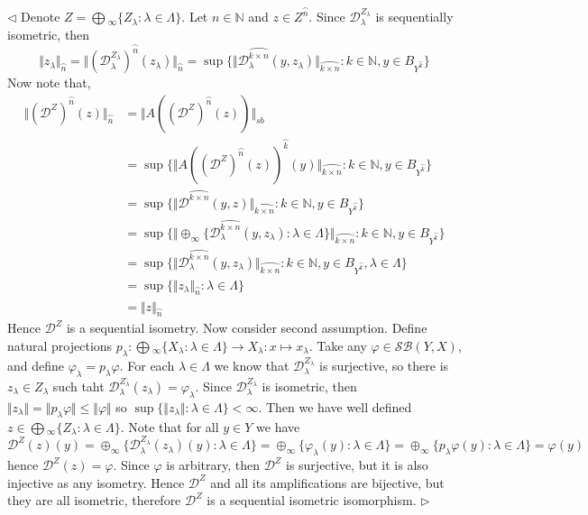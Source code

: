 \documentclass[12pt]{article}
\newenvironment{proof}{\par $\triangleleft$}{$\triangleright$}
\begin{document}
\begin{proof} Denote $Z=\bigoplus{}_\infty\{Z_\lambda:\lambda\in\Lambda\}$. Let $n\in\mathbb{N}$ and $z\in Z^{\wideparen{n}}$. Since $\mathcal{D}_\lambda^{Z_\lambda}$ is sequentially isometric, then
$$
\Vert z_\lambda\Vert_{\wideparen{n}}
=\Vert (\mathcal{D}_\lambda^{Z_\lambda})^{\wideparen{n}}(z_\lambda)\Vert_{\wideparen{n}}
=\sup\{\Vert \mathcal{D}_\lambda^{\wideparen{k\times n}}(y,z_\lambda)\Vert_{\wideparen{k\times n}}:k\in\mathbb{N},y\in B_{Y^{\wideparen{k}}}\}
$$
Now note that,
$$
\begin{aligned}
\Vert(\mathcal{D}^Z)^{\wideparen{n}}(z)\Vert_{\wideparen{n}}
&=\Vert A((\mathcal{D}^Z)^{\wideparen{n}}(z))\Vert_{sb}\\
&=\sup\{\Vert A((\mathcal{D}^Z)^{\wideparen{n}}(z))^{\wideparen{k}}(y)\Vert_{\wideparen{k\times n}}:k\in\mathbb{N},y\in B_{Y^{\wideparen{k}}}\}\\
&=\sup\{\Vert \mathcal{D}^{\wideparen{k\times n}}(y,z)\Vert_{\wideparen{k\times n}}:k\in\mathbb{N},y\in B_{Y^{\wideparen{k}}}\}\\
&=\sup\{\Vert \oplus_\infty\{\mathcal{D}_\lambda^{\wideparen{k\times n}}(y,z_\lambda):\lambda\in\Lambda\}\Vert_{\wideparen{k\times n}}:k\in\mathbb{N},y\in B_{Y^{\wideparen{k}}}\}\\
&=\sup\{\Vert \mathcal{D}_\lambda^{\wideparen{k\times n}}(y,z_\lambda)\Vert_{\wideparen{k\times n}}:k\in\mathbb{N},y\in B_{Y^{\wideparen{k}}},\lambda\in\Lambda\}\\
&=\sup\{\Vert z_\lambda\Vert_{\wideparen{n}}:\lambda\in\Lambda\}\\
&=\Vert z\Vert_{\wideparen{n}}
\end{aligned}
$$
Hence $\mathcal{D}^Z$ is a sequential isometry. Now consider second assumption. Define natural projections $p_\lambda:\bigoplus{}_\infty\{X_\lambda:\lambda\in\Lambda\}\to X_\lambda:x\mapsto x_\lambda$. Take any $\varphi\in\mathcal{SB}(Y,X)$, and define $\varphi_\lambda=p_\lambda\varphi$. For each $\lambda\in\Lambda$ we know that $\mathcal{D}_\lambda^{Z_\lambda}$ is surjective, so there is $z_\lambda\in Z_\lambda$ such taht $\mathcal{D}_\lambda^{Z_\lambda}(z_\lambda)=\varphi_\lambda$. Since $\mathcal{D}_\lambda^{Z_\lambda}$ is isometric, then $\Vert z_\lambda\Vert=\Vert p_\lambda\varphi\Vert\leq\Vert \varphi\Vert$ so $\sup\{\Vert z_\lambda\Vert:\lambda\in\Lambda\}<\infty$. Then we have well defined $z\in\bigoplus{}_\infty\{Z_\lambda:\lambda\in\Lambda\}$. Note that for all $y\in Y$ we have
$$
\mathcal{D}^{Z}(z)(y)
=\oplus_\infty\{\mathcal{D}_\lambda^{Z_\lambda}(z_\lambda)(y):\lambda\in\Lambda\}
=\oplus_\infty\{\varphi_\lambda(y):\lambda\in\Lambda\}
=\oplus_\infty\{p_\lambda\varphi(y):\lambda\in\Lambda\}
=\varphi(y)
$$
hence $\mathcal{D}^Z(z)=\varphi$. Since $\varphi$ is arbitrary, then $\mathcal{D}^Z$ is surjective, but it is also injective as any isometry. Hence $\mathcal{D}^Z$ and all its amplifications are bijective, but they are all isometric, therefore $\mathcal{D}^Z$ is a sequential isometric isomorphism.
\end{proof}
\end{document}
